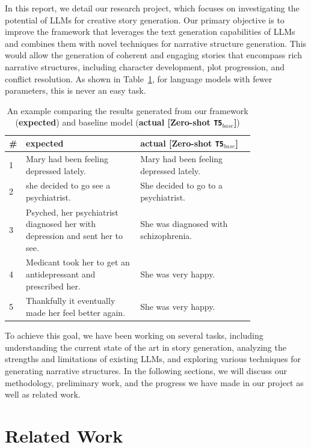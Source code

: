 \documentclass{article} %
\begin{document}
In this report, we detail our research project, which focuses on investigating the potential of LLMs for creative story generation. Our primary objective is to improve the framework that leverages the text generation capabilities of LLMs and combines them with novel techniques for narrative structure generation. This would allow the generation of coherent and engaging stories that encompass rich narrative structures, including character development, plot progression, and conflict resolution. As shown in Table~\ref{storyExampleII}, for language models with fewer parameters, this is never an easy task.

\begin{table}[h]
    \centering
    \caption{An example comparing the results generated from our framework (\textbf{expected}) and baseline model (\textbf{actual [Zero-shot \texttt{T5$_{base}$}]})}
    \begin{tabular}{p{0.01\linewidth} | p{0.40\linewidth}|p{0.40\linewidth}}
    \textbf{\#} & \textbf{expected}                & \textbf{actual [Zero-shot \texttt{T5$_{base}$}]}                \\ \hline
    1 & Mary had been feeling depressed lately.                        & Mary had been feeling depressed lately. \\ \hline
    2 & she decided to go see a psychiatrist.                          & She decided to go to a psychiatrist.    \\ \hline
    3 & Psyched, her psychiatrist diagnosed her with depression and sent her to see. & She was diagnosed with schizophrenia. \\ \hline
    4 & Medicant took her to get an antidepressant and prescribed her. & She was very happy.                     \\ \hline
    5 & Thankfully it eventually made her feel better again.           & She was very happy.                    
    \end{tabular}%
    \label{storyExampleII}
\end{table}

To achieve this goal, we have been working on several tasks, including understanding the current state of the art in story generation, analyzing the strengths and limitations of existing LLMs, and exploring various techniques for generating narrative structures. In the following sections, we will discuss our methodology, preliminary work, and the progress we have made in our project as well as related work.


\section{Related Work}
\end{document}

